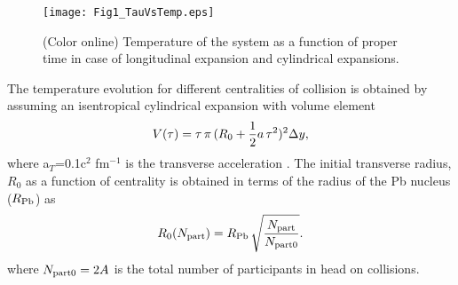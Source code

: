\documentclass[aps,prc,preprint,superscriptaddress,showpacs,showkeys]{revtex4-1}
\begin{document}
\begin{figure}
\texttt{[image: Fig1\_TauVsTemp.eps]}
\caption{(Color online) Temperature of the system as a function of proper time in case of 
longitudinal expansion and cylindrical expansions.}
\label{fig:TauVsTemp}
\end{figure}
 The temperature evolution for different centralities of collision is obtained by 
assuming an isentropical cylindrical expansion with volume element
\begin{equation}
V(\tau) = \tau\,\pi\,(R_0 + {1\over 2} a \, \tau^2 )^{2}\Delta y,
\end{equation}
 where a$_T$=0.1c$^2$ fm$^{-1}$ is the transverse acceleration \cite{RAPc}.
 The initial transverse radius, $R_0$ as a function of centrality is 
obtained in terms of the radius of the Pb nucleus ($R_{\rm Pb}$) as
\begin{equation}
R_0(N_{\rm part}) = R_{\rm Pb} \, \sqrt{N_{\rm part} \over N_{\rm part0} }.
\label{RVsNPart}
\end{equation}
where $N_{\rm part0} = 2A$ is the total number of participants in head on collisions.
\end{document}
